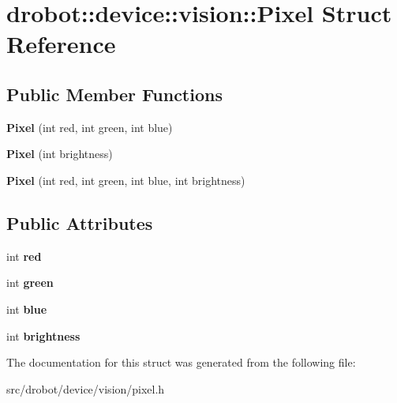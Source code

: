 \hypertarget{structdrobot_1_1device_1_1vision_1_1Pixel}{\section{drobot\-:\-:device\-:\-:vision\-:\-:Pixel Struct Reference}
\label{structdrobot_1_1device_1_1vision_1_1Pixel}
}
\subsection*{Public Member Functions}
\begin{DoxyCompactItemize}
\item 
\hypertarget{structdrobot_1_1device_1_1vision_1_1Pixel_afa58aa9520fed71c437a96746d82e2f8}{{\bfseries Pixel} (int red, int green, int blue)}\label{structdrobot_1_1device_1_1vision_1_1Pixel_afa58aa9520fed71c437a96746d82e2f8}

\item 
\hypertarget{structdrobot_1_1device_1_1vision_1_1Pixel_a430772f0631d5286c777c40bbb40a88f}{{\bfseries Pixel} (int brightness)}\label{structdrobot_1_1device_1_1vision_1_1Pixel_a430772f0631d5286c777c40bbb40a88f}

\item 
\hypertarget{structdrobot_1_1device_1_1vision_1_1Pixel_af436a88672b0ddaff3dc333c9ddb113a}{{\bfseries Pixel} (int red, int green, int blue, int brightness)}\label{structdrobot_1_1device_1_1vision_1_1Pixel_af436a88672b0ddaff3dc333c9ddb113a}

\end{DoxyCompactItemize}
\subsection*{Public Attributes}
\begin{DoxyCompactItemize}
\item 
\hypertarget{structdrobot_1_1device_1_1vision_1_1Pixel_a265c4e311e5ea3c42b73868508a0f9fd}{int {\bfseries red}}\label{structdrobot_1_1device_1_1vision_1_1Pixel_a265c4e311e5ea3c42b73868508a0f9fd}

\item 
\hypertarget{structdrobot_1_1device_1_1vision_1_1Pixel_a6d57169f3294c397ecd9c25c30d4adae}{int {\bfseries green}}\label{structdrobot_1_1device_1_1vision_1_1Pixel_a6d57169f3294c397ecd9c25c30d4adae}

\item 
\hypertarget{structdrobot_1_1device_1_1vision_1_1Pixel_abb8ae018ebff8e8a5100006cbcf2e81d}{int {\bfseries blue}}\label{structdrobot_1_1device_1_1vision_1_1Pixel_abb8ae018ebff8e8a5100006cbcf2e81d}

\item 
\hypertarget{structdrobot_1_1device_1_1vision_1_1Pixel_ab6662ba55e20dce08e7c301eae98a934}{int {\bfseries brightness}}\label{structdrobot_1_1device_1_1vision_1_1Pixel_ab6662ba55e20dce08e7c301eae98a934}

\end{DoxyCompactItemize}


The documentation for this struct was generated from the following file\-:\begin{DoxyCompactItemize}
\item 
src/drobot/device/vision/pixel.\-h\end{DoxyCompactItemize}
